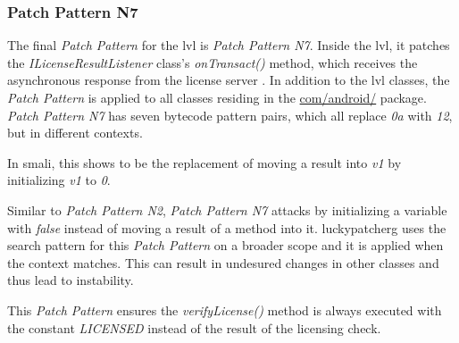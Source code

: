 \subsubsection{Patch Pattern N7}
The final \textit{Patch Pattern} for the \gls{lvl} is \textit{Patch Pattern N7}.
Inside the lvl, it patches the \textit{ILicenseResultListener} class's \textit{onTransact()} method, which receives the asynchronous response from the license server \cite{developersLicensingReference}.
In addition to the lvl classes, the \textit{Patch Pattern} is applied to all classes residing in the \url{com/android/} package.
\newline
\textit{Patch Pattern N7} has seven bytecode pattern pairs, which all replace \textit{0a} with \textit{12}, but in different contexts.
\newline

In smali, this shows to be the replacement of moving a result into \textit{v1} by initializing \textit{v1}  to \textit{0}.
\newline

Similar to \textit{Patch Pattern N2}, \textit{Patch Pattern N7} attacks by initializing a variable with \textit{false} instead of moving a result of a method into it.
\newline
\gls{luckypatcherg} uses the search pattern for this \textit{Patch Pattern} on a broader scope and it is applied when the context matches.
This can result in undesured changes in other classes and thus lead to instability.
\newline

This \textit{Patch Pattern} ensures the \textit{verifyLicense()} method is always executed with the constant \textit{LICENSED} instead of the result of the licensing check.

